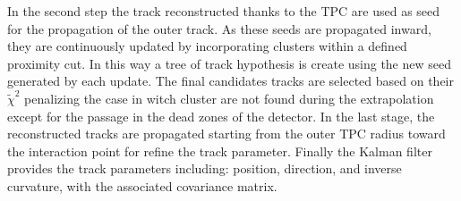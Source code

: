 \documentclass[12pt,a4paper]{book}
\begin{document}
In the second step the track reconstructed thanks to the TPC are used as seed for the propagation of the outer track. As these seeds are propagated inward, they are continuously updated by  incorporating clusters within a defined proximity cut. In this way a tree of track hypothesis is create using the new seed generated by each update. The final candidates tracks are selected based on their $\tilde{\chi}^2$ penalizing the case in witch cluster are not found during the extrapolation except for the passage in the dead zones of the detector. In the last stage, the reconstructed tracks are propagated starting from the outer TPC radius toward the interaction point for refine the track parameter. Finally the Kalman filter provides the track parameters including: position, direction, and inverse curvature, with the associated covariance matrix.    
\end{document}
